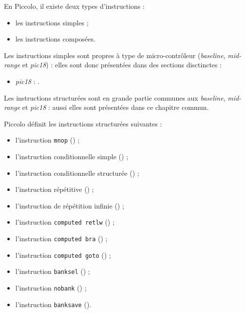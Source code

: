 
\cleardoublepage


\thispagestyle{empty}

En Piccolo, il existe deux types d'instructions :
\begin{itemize}
  \item les instructions simples ;
  \item les instructions composées.
\end{itemize}

Les instructions simples sont propres à type de micro-contrôleur (\emph{baseline}, \emph{mid-range} et \emph{pic18}) : elles sont donc présentées dans des sections disctinctes :
\begin{itemize}
  \item \emph{pic18} : .
\end{itemize}


Les instructions structurées sont en grande partie communes aux \emph{baseline}, \emph{mid-range} et \emph{pic18} : aussi elles sont présentées dans ce chapitre commun.

Piccolo définit les instructions structurées suivantes :
\begin{itemize}
  \item l'instruction \texttt{mnop} () ;
  \item l'instruction conditionnelle simple () ;
  \item l'instruction conditionnelle structurée () ;
  \item l'instruction répétitive () ;
  \item l'instruction de répétition infinie () ;
  \item l'instruction \texttt{computed retlw} () ;
  \item l'instruction \texttt{computed bra} () ;
  \item l'instruction \texttt{computed goto} () ;
  \item l'instruction \texttt{banksel} () ;
  \item l'instruction \texttt{nobank} () ;
  \item l'instruction \texttt{banksave} ().
\end{itemize}

